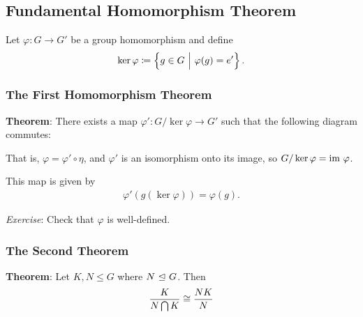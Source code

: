 \hypertarget{fundamental-homomorphism-theorem}{%
\subsection{Fundamental Homomorphism
Theorem}\label{fundamental-homomorphism-theorem}}

Let \(\varphi: G \to G'\) be a group homomorphism and define
\begin{align*}
\ker \varphi \coloneqq \left\{{g\in G {~\mathrel{\Big|}~} \varphi(g) = e'}\right\}
.\end{align*}

\hypertarget{the-first-homomorphism-theorem}{%
\subsubsection{The First Homomorphism
Theorem}\label{the-first-homomorphism-theorem}}

\textbf{Theorem}: There exists a map \(\varphi': G/\ker \varphi \to G'\)
such that the following diagram commutes:

\begin{center}
\end{center}

That is, \(\varphi = \varphi' \circ \eta\), and \(\varphi'\) is an
isomorphism onto its image, so \(G/\ker \varphi = {\text{im}~} \varphi\).

This map is given by
\begin{align*}
\varphi'(g(\ker \varphi)) = \varphi(g)
.\end{align*}

\emph{Exercise}: Check that \(\varphi\) is well-defined.

\hypertarget{the-second-theorem}{%
\subsubsection{The Second Theorem}\label{the-second-theorem}}

\textbf{Theorem}: Let \(K, N \leq G\) where \(N {~\trianglelefteq~} G\). Then
\begin{align*}
\frac K {N \bigcap K} \cong \frac {NK} N
\end{align*}

